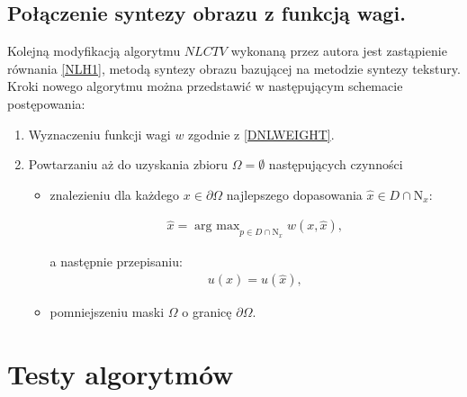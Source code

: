 \documentclass[12pt, twoside, openany]{report}
\theoremstyle{definition}
\begin{document}
\section{Połączenie syntezy obrazu z funkcją wagi.}
Kolejną modyfikacją algorytmu $NLCTV$ wykonaną przez autora jest zastąpienie równania \eqref{NLH1}, metodą syntezy obrazu bazującej na metodzie syntezy tekstury. Kroki nowego algorytmu można przedstawić w następującym schemacie postępowania:
\begin{enumerate}
\item
Wyznaczeniu funkcji wagi $w$ zgodnie z \eqref{DNLWEIGHT}.
\item
Powtarzaniu aż do uzyskania zbioru $\Omega = \emptyset$ następujących czynności
\begin{itemize}
\item
znalezieniu dla każdego $x \in \partial\Omega$ najlepszego dopasowania $\hat{x} \in D \cap \mathrm{N}_x$:
\begin{large}
\begin{align}
\hat{x} = \mathop{\mathrm{arg \ max}}_{p \in D \cap \mathrm{N}_x} w(x,\hat{x}),
\end{align}
\end{large}
a następnie przepisaniu:
\begin{align}
u(x) = \hat{u}(\hat{x}),
\end{align}
\item
pomniejszeniu maski $\Omega$ o granicę $\partial\Omega$.
\end{itemize}
\end{enumerate}
\chapter{Testy algorytmów}
\end{document}
